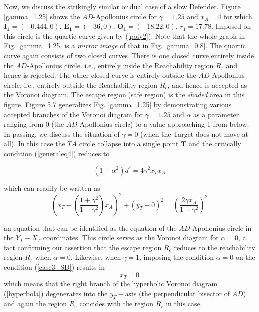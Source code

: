 Now, we discuss the strikingly similar or dual case of a slow Defender. Figure \ref{gamma=1.25} shows the $AD$-Apollonius circle for $\gamma=1.25$ and $x_A=4$ for which $\boldsymbol{I_1}=(-0.444,0)$, $\boldsymbol{E_1}=(-36,0)$, $\boldsymbol{O_1}=(-18.22,0)$, $r_1=17.78$. Imposed on this circle is the quartic curve given by (\ref{poly2}). Note that the whole graph in Fig. \ref{gamma=1.25} is a \textit{mirror image} of that in Fig. \ref{gamma=0.8}. The quartic curve again consists of two closed curves. There is one closed curve entirely inside the $AD$-Apollonius circle. i.e., entirely inside the Reachability region $R_r$ and hence is rejected. The other closed curve is entirely outside the $AD$-Apollonius circle, i.e., entirely outside the Reachability region $R_r$, and hence is accepted as the Voronoi diagram. The escape region (safe region) is the \textit{shaded} area in this figure. Figure 5.7 generalizes Fig. \ref{gamma=1.25} by demonstrating various accepted branches of the Voronoi diagram for $\gamma=1.25$ and $\alpha$ as a parameter ranging from 0 (the $AD$-Apollonius circle) to a value approaching 1 from below.\\ 
    

In passing, we discuss the situation of $\gamma=0$ (when the Target does not move at all). In this case the $TA$ circle collapse into a single point $\boldsymbol{T}$ and the critically condition (\ref{generaleq4}) reduces to 

\begin{equation}
(1-\alpha^{2})d^{2}= 4 \gamma^{2} x_{T} x_{A}
\end{equation}

which can readily be written as 
\begin{equation}
(x_T-(\dfrac{1+\gamma^2}{1-\gamma^2})x_A)^2+(y_T-0)^2
=(\dfrac{2\gamma x_{A}}{1-\gamma^{2}})^{2}
\end{equation}

an equation that can be identified as the equation of the $AD$ Apollonius circle in the $Y_T-X_T$ coordinates.
This circle serves as the Voronoi diagram for $\alpha=0$, a fact confirming our assertion that the escape region $R_e$ reduces to the reachability region $R_r$ when $\alpha=0$. Likewise, when $\gamma=1$, imposing the condition $\alpha=0$ on the condition (\ref{case3_SD}) results in 
\begin{equation}
x_T=0
\end{equation} 
which means that the right branch of the hyperbolic Voronoi diagram (\ref{hyperbola}) degenerates into the $y_T-$axis (the perpendicular bisector of $\overline{AD}$) and again the region $R_e$ concides with the region $R_r$ in this case.


